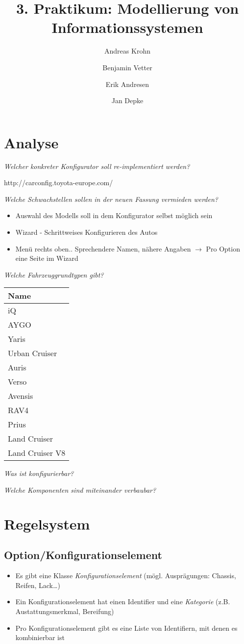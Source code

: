\documentclass[a4paper,10pt]{article}
\title{3. Praktikum: Modellierung von Informationssystemen}
\author{Andreas Krohn \and Benjamin Vetter \and Erik Andresen \and Jan Depke}
\begin{document}
\maketitle

\tableofcontents

\section{Analyse}
\emph{Welcher konkreter Konfigurator soll re-implementiert werden?}

http://carconfig.toyota-europe.com/

\emph{Welche Schwachstellen sollen in der neuen Fassung vermieden werden?}

\begin{itemize}
 \item Auswahl des Modells soll in dem Konfigurator selbst möglich sein
 \item Wizard - Schrittweises Konfigurieren des Autos
 \item Menü rechts oben.. Sprechendere Namen, nähere Angaben $\rightarrow$ Pro Option eine Seite im Wizard
\end{itemize}

\emph{Welche Fahrzeuggrundtypen gibt?}

\begin{tabular}{|l|}
\hline
Name \\
\hline
iQ \\
AYGO \\
Yaris \\
Urban Cruiser \\
Auris \\
Verso \\
Avensis \\
RAV4 \\
Prius \\
Land Cruiser \\
Land Cruiser V8 \\
\hline
\end{tabular}

\emph{Was ist konfigurierbar?}

\emph{Welche Komponenten sind miteinander verbaubar?}

\section{Regelsystem}

\subsection*{Option/Konfigurationselement}
\begin{itemize}
 \item Es gibt eine Klasse \emph{Konfigurationselement} (mögl. Ausprägungen: Chassis, Reifen, Lack\ldots)
 \item Ein Konfigurationselement hat einen Identifier und eine \emph{Kategorie} (z.B. Austattungsmerkmal, Bereifung)
 \item Pro Konfigurationselement gibt es eine Liste von Identifiern, mit denen es kombinierbar ist
\end{itemize}
\end{document}
